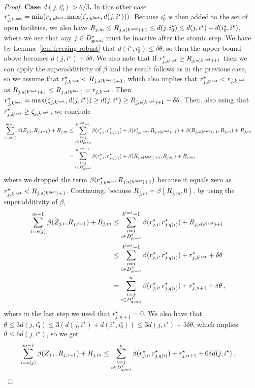 \begin{proof}
\textbf{Case $d(j, i_0^\star) > \theta/3$.} In this other case $r^\star_{j, k^{\mathrm{last}}} = \min(r_{j, k^{\mathrm{last}}}, \max(\zeta_{j, k^{\mathrm{last}}}, d(j, i^\star)))$.
Because $i_0^\star$ is then added to the set of open facilities, we also have $R_{j,m} \leq R_{j,s(k^{\mathrm{last}})+1} \leq d(j, i_0^\star) \leq d(j, i^\star) + d(i_0^\star, i^\star)$, where we use that any $j \in D^\star_{\mathrm{good}}$ must be inactive after the atomic step.
We have by Lemma~\ref{lem:freezing-robust} that $d(i^\star, i_0^\star) \leq \delta \theta$, so then the upper bound above becomes $d(j, i^\star) + \delta \theta$.
We also note that if $r^\star_{j, k^{\mathrm{last}}} \geq R_{j, s(k^{\mathrm{last}}) + 1}$ then we can apply the superadditivity of $\beta$ and the result follows as in the previous case, so we assume that $r^\star_{j, k^{\mathrm{last}}} < R_{j, s(k^{\mathrm{last}}) + 1}$, which also implies that $r^\star_{j, k^{\mathrm{last}}} < r_{j,k^{\mathrm{last}}}$ as $R_{j, s(k^{\mathrm{last}}) + 1} \leq R_{j, s(k^{\mathrm{last}})} = r_{j,k^{\mathrm{last}}}$.
Then $r^\star_{j, k^{\mathrm{last}}} = \max(\zeta_{j,k^{\mathrm{last}}}, d(j, i^\star)) \geq d(j, i^\star) \geq R_{j,s(k^{\mathrm{last}})+1} - \delta \theta$.
Then, also using that $r^\star_{j, k^{\mathrm{last}}} \geq \zeta_{j,k^{\mathrm{last}}}$, we conclude
\begin{align*}
\sum_{i=s(j)}^{m-1} \beta(Z_{j,i}, R_{j,i+1}) + R_{j, m}
&\leq \sum_{\substack{i=j\\i \in D^\star_{\mathrm{good}}}}^{k^{\mathrm{last}} - 1} \beta(r^\star_{j,i}, r^\star_{j,q(i)}) + \beta(r^\star_{j,k^{\mathrm{last}}}, R_{j,s(k^{\mathrm{last}})+1}) + \beta(R_{j,s(k^{\mathrm{last}})+1}, R_{j,m}) + R_{j,m}\\
&= \sum_{\substack{i=j\\i \in D^\star_{\mathrm{good}}}}^{k^{\mathrm{last}} - 1} \beta(r^\star_{j,i}, r^\star_{j,q(i)}) + \beta(R_{j,s(k^{\mathrm{last}})+1}, R_{j,m}) + R_{j,m},
\end{align*}
where we dropped the term $\beta(r^\star_{j,k^{\mathrm{last}}}, R_{j,s(k^{\mathrm{last}})+1})$ because it equals zero as $r^\star_{j,k^{\mathrm{last}}} < R_{j,s(k^{\mathrm{last}})+1}$.
Continuing, because $R_{j,m}=\beta(R_{j,m},0)$, by using the superadditivity of $\beta$,
\begin{align*}
\sum_{i=s(j)}^{m-1} \beta(Z_{j,i}, R_{j,i+1}) + R_{j, m}
&\leq \sum_{\substack{i=j\\i \in D^\star_{\mathrm{good}}}}^{k^{\mathrm{last}} - 1} \beta(r^\star_{j,i}, r^\star_{j,q(i)}) + R_{j,s(k^{\mathrm{last}})+1}\\
&\leq \sum_{\substack{i=j\\i \in D^\star_{\mathrm{good}}}}^{k^{\mathrm{last}} - 1} \beta(r^\star_{j,i}, r^\star_{j,q(i)}) + r^\star_{j,k^{\mathrm{last}}} + \delta \theta\\
&= \sum_{\substack{i=j\\i \in D^\star_{\mathrm{good}}}}^n \beta(r^\star_{j,i}, r^\star_{j,q(i)}) + r^\star_{j,n+1} + \delta \theta\,,
\end{align*}
where in the last step we used that $r^\star_{j,n+1}=0$. We also have that $\theta \leq 3 d(j, i_0^\star) \leq 3 (d(j, i^\star) + d(i^\star,i_0^\star)) \leq 3d(j,i^\star) + 3 \delta \theta$, which implies $\theta \leq 6 d(j, i^\star)$, so we get
\[\sum_{i=s(j)}^{m-1} \beta(Z_{j,i}, R_{j,i+1}) + R_{j, m} \leq \sum_{\substack{i=j\\i \in D^\star_{\mathrm{good}}}}^n \beta(r^\star_{j,i}, r^\star_{j,q(i)}) + r^\star_{j,n+1} + 6 \delta d(j, i^\star)\,.\]
\end{proof}

